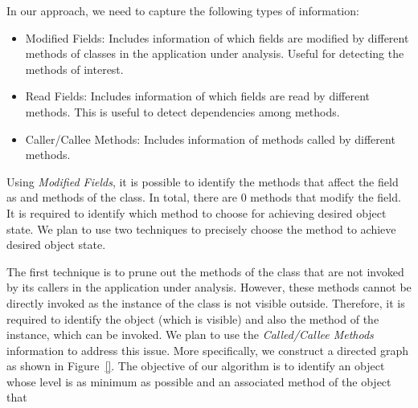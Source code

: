 In our approach, we need to capture the following types of information:

\begin{itemize}
\item Modified Fields: Includes information of which fields are modified by different methods of classes in the application under analysis. Useful for detecting the methods of interest.
\item Read Fields: Includes information of which fields are read by different methods. This is useful to detect dependencies among methods.
\item Caller/Callee Methods: Includes information of methods called by different methods.
\end{itemize}

Using \emph{Modified Fields}, it is possible to identify the methods that affect the  field as  and  methods of the  class. In total, there are $0$ methods that modify the  field. It is required to identify which method to choose for achieving desired object state. We plan to use two techniques to precisely choose the method to achieve desired object state.

The first technique is to prune out the methods of the  class that are not invoked by its callers in the application under analysis. 
However, these methods cannot be directly invoked as the instance of the  class is not visible outside. Therefore, it is required to identify the object (which is visible) and also the method of the instance, which can be invoked. We plan to use the \emph{Called/Callee Methods} information to address this issue. More specifically, we construct a directed graph as shown in Figure~\ref{}. The objective of our algorithm is to identify an object whose level is as minimum as possible and an associated method of the object that 


